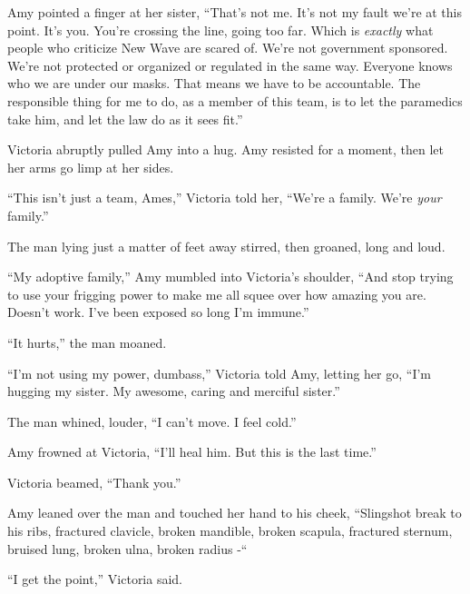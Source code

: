 Amy pointed a finger at her sister, ``That's not me.  It's not my fault we're at this point.  It's you.  You're crossing the line, going too far.  Which is\emph{ exactly} what people who criticize New Wave are scared of.  We're not government sponsored.  We're not protected or organized or regulated in the same way.  Everyone knows who we are under our masks.  That means we have to be accountable.  The responsible thing for me to do, as a member of this team, is to let the paramedics take him, and let the law do as it sees fit.''



Victoria abruptly pulled Amy into a hug.  Amy resisted for a moment, then let her arms go limp at her sides.



``This isn't just a team, Ames,'' Victoria told her, ``We're a family.  We're \emph{your} family.''



The man lying just a matter of feet away stirred, then groaned, long and loud.



``My adoptive family,'' Amy mumbled into Victoria's shoulder, ``And stop trying to use your frigging power to make me all squee over how amazing you are.  Doesn't work.  I've been exposed so long I'm immune.''



``It hurts,'' the man moaned.



``I'm not using my power, dumbass,'' Victoria told Amy, letting her go, ``I'm hugging my sister.  My awesome, caring and merciful sister.''



The man whined, louder, ``I can't move.  I feel cold.''



Amy frowned at Victoria, ``I'll heal him.  But this is the last time.''



Victoria beamed, ``Thank you.''



Amy leaned over the man and touched her hand to his cheek, ``Slingshot break to his ribs, fractured clavicle, broken mandible, broken scapula, fractured sternum, bruised lung, broken ulna, broken radius -``



``I get the point,'' Victoria said.



